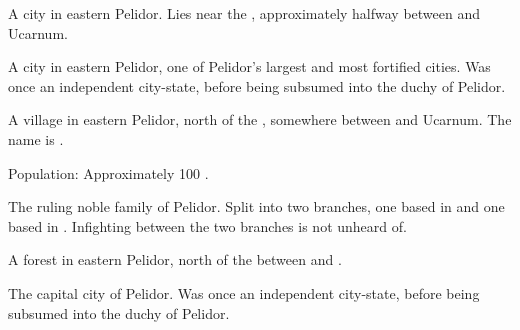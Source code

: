\begin{gloss}
\begin{subgloss}
  \begin{comment}
  \subparagraph{Dendrum}
  \end{comment}
  A city in eastern Pelidor. 
  Lies near the , approximately halfway between  and {Ucarnum}. 






  \begin{comment}
  \subparagraph{\Forklin}
  \end{comment}
  \gitem{\Forklin}
  \index{\Forklin}
  A city in eastern Pelidor, one of Pelidor's largest and most fortified cities. 
  Was once an independent city-state, before being subsumed into the duchy of Pelidor. 
  
  
  
  
  
  \begin{comment}
  \subparagraph{Gilwaed}
  \end{comment}
  A village in eastern Pelidor, north of the , somewhere between  and {Ucarnum}. 
  The name is \Tepharin. 
  
  Population: Approximately 100 \scathae. 
  
  
  
  
  
  \begin{comment}
  \subparagraph{House Pelidor}
  \end{comment}
  The ruling noble family of Pelidor. 
  Split into two branches, one based in  and one based in . 
  Infighting between the two branches is not unheard of. 
  
  
  
  
  
  \begin{comment}
  \subparagraph{Kenshaer}
  \end{comment}
  A  forest in eastern Pelidor, north of the  between \Forklin{} and . 
  
  
  
  
  
  \begin{comment}
  \subparagraph{\Malcur}
  \end{comment}
  \gitem{\Malcur}
  \index{\Malcur}
  The capital city of Pelidor. 
  Was once an independent city-state, before being subsumed into the duchy of Pelidor. 
  

\end{subgloss}
\end{gloss}
